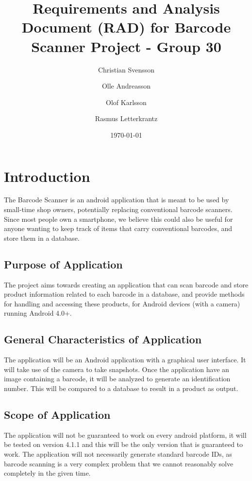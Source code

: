 \documentclass{report}
\begin{document}
\title{Requirements and Analysis Document (RAD) for Barcode Scanner Project - Group 30}
\author{
    Christian Svensson\\
    \and
    Olle Andreasson\\
    \and
    Olof Karlsson\\
    \and
    Rasmus Letterkrantz
}
\date{\today}
\maketitle

\tableofcontents

\chapter{Introduction}

The Barcode Scanner is an android application that is meant to be used by small-time shop owners, potentially replacing conventional barcode scanners. Since most people own a smartphone, we believe this could also be useful for anyone wanting to keep track of items that carry conventional barcodes, and store them in a database.

\section{Purpose of Application}
The project aims towards creating an application that can scan barcode and store product information related to each barcode in a database, and provide methods for handling and accessing these products, for Android devices (with a camera) running Android 4.0+.

\section{General Characteristics of Application}
The application will be an Android application with a graphical user interface. It will take use of the camera to take snapshots. Once the application have an image containing a barcode, it will be analyzed to generate an identification number. This will be compared to a database to result in a product as output.\cite{website:barcodescanner}\cite{website:barcodehowto}

\section{Scope of Application}
The application will not be guaranteed to work on every android platform, it will be tested on version 4.1.1 and this will be the only version that is guaranteed to work. The application will not necessarily generate standard barcode IDs, as barcode scanning is a very complex problem that we cannot reasonably solve completely in the given time.
\end{document}
